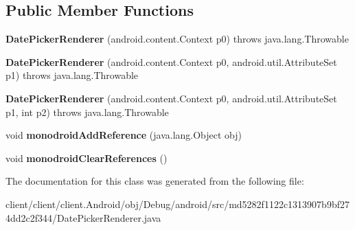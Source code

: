 \subsection*{Public Member Functions}
\begin{DoxyCompactItemize}
\item 
\hypertarget{classmd5282f1122c1313907b9bf274dd2c2f344_1_1DatePickerRenderer_a56d3bedaca7315602b786515b808240a}{}{\bfseries Date\+Picker\+Renderer} (android.\+content.\+Context p0)  throws java.\+lang.\+Throwable 	\label{classmd5282f1122c1313907b9bf274dd2c2f344_1_1DatePickerRenderer_a56d3bedaca7315602b786515b808240a}

\item 
\hypertarget{classmd5282f1122c1313907b9bf274dd2c2f344_1_1DatePickerRenderer_aff04bade679640a58c748261c5f59d74}{}{\bfseries Date\+Picker\+Renderer} (android.\+content.\+Context p0, android.\+util.\+Attribute\+Set p1)  throws java.\+lang.\+Throwable 	\label{classmd5282f1122c1313907b9bf274dd2c2f344_1_1DatePickerRenderer_aff04bade679640a58c748261c5f59d74}

\item 
\hypertarget{classmd5282f1122c1313907b9bf274dd2c2f344_1_1DatePickerRenderer_adac75752cd89df85df18263baebc683a}{}{\bfseries Date\+Picker\+Renderer} (android.\+content.\+Context p0, android.\+util.\+Attribute\+Set p1, int p2)  throws java.\+lang.\+Throwable 	\label{classmd5282f1122c1313907b9bf274dd2c2f344_1_1DatePickerRenderer_adac75752cd89df85df18263baebc683a}

\item 
\hypertarget{classmd5282f1122c1313907b9bf274dd2c2f344_1_1DatePickerRenderer_a0c4f0e3add3e596fdd337b5e703eabaa}{}void {\bfseries monodroid\+Add\+Reference} (java.\+lang.\+Object obj)\label{classmd5282f1122c1313907b9bf274dd2c2f344_1_1DatePickerRenderer_a0c4f0e3add3e596fdd337b5e703eabaa}

\item 
\hypertarget{classmd5282f1122c1313907b9bf274dd2c2f344_1_1DatePickerRenderer_abb40779d37e6696f231bf7e92f6d4443}{}void {\bfseries monodroid\+Clear\+References} ()\label{classmd5282f1122c1313907b9bf274dd2c2f344_1_1DatePickerRenderer_abb40779d37e6696f231bf7e92f6d4443}

\end{DoxyCompactItemize}


The documentation for this class was generated from the following file\+:\begin{DoxyCompactItemize}
\item 
client/client/client.\+Android/obj/\+Debug/android/src/md5282f1122c1313907b9bf274dd2c2f344/Date\+Picker\+Renderer.\+java\end{DoxyCompactItemize}
